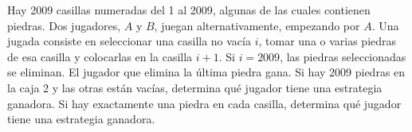 Hay 2009 casillas numeradas del 1 al 2009, algunas de las cuales contienen piedras. Dos jugadores, $ A$ y $ B$, juegan alternativamente, empezando por $ A$. Una jugada consiste en seleccionar una casilla no vacía $ i$, tomar una o varias piedras de esa casilla y colocarlas en la casilla $ i + 1$. Si $ i = 2009$, las piedras seleccionadas se eliminan. El jugador que elimina la última piedra gana. Si hay 2009 piedras en la caja 2 y las otras están vacías, determina qué jugador tiene una estrategia ganadora. Si hay exactamente una piedra en cada casilla, determina qué jugador tiene una estrategia ganadora.

